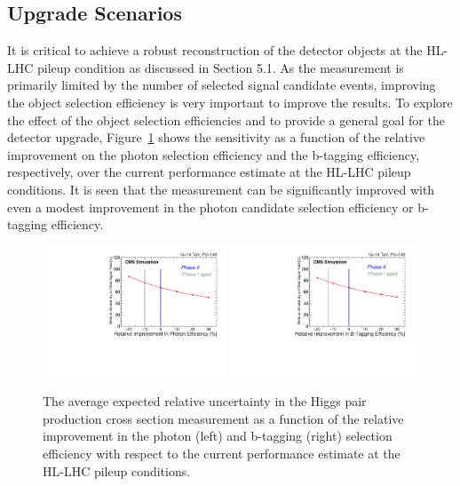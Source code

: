 \subsection{Upgrade Scenarios}
\label{sec:scenarios}

It is critical to achieve a robust reconstruction of the detector objects at the HL-LHC pileup condition as discussed in Section 5.1. As the measurement is primarily limited by the number of selected signal candidate events, improving the object selection efficiency is very important to improve the results. To explore the effect of the object selection efficiencies and to provide a general goal for the detector upgrade, Figure~\ref{fig:PhotonEffImprovementScan} shows the sensitivity as a function of the relative improvement on the photon selection efficiency and the b-tagging efficiency, respectively, over the current performance estimate at the HL-LHC pileup conditions. It is seen that the measurement can be significantly improved with even a modest improvement in the photon candidate selection efficiency or b-tagging efficiency. 

\begin{figure}[h]
  \centering
  \includegraphics[width=0.49\textwidth]{figures_chapter6/XSUncertaintyVsPhotonEffRatio.pdf}
  \includegraphics[width=0.49\textwidth]{figures_chapter6/XSUncertaintyVsBtagEffRatio.pdf}
  \caption{ The average expected relative uncertainty in the Higgs pair production cross section measurement as a function of the relative improvement in the photon (left) and b-tagging (right) selection efficiency with respect to the current performance estimate at the HL-LHC pileup conditions.}
  \label{fig:PhotonEffImprovementScan}
\end{figure}


